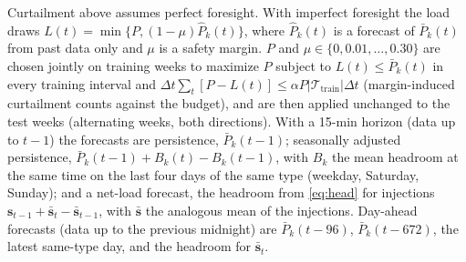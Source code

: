 \documentclass[conference,letterpaper]{IEEEtran}
\begin{document}
Curtailment above assumes perfect foresight. With imperfect foresight the load draws $L(t)=\min\{P,(1-\mu)\hat P_k(t)\}$, where $\hat P_k(t)$ is a forecast of $\bar P_k(t)$ from past data only and $\mu$ is a safety margin. $P$ and $\mu\in\{0,0.01,\dots,0.30\}$ are chosen jointly on training weeks to maximize $P$ subject to $L(t)\le\bar P_k(t)$ in every training interval and $\Delta t\sum_t[P-L(t)]\le\alpha P|\mathcal T_{\mathrm{train}}|\Delta t$ (margin-induced curtailment counts against the budget), and are then applied unchanged to the test weeks (alternating weeks, both directions). With a 15-min horizon (data up to $t-1$) the forecasts are persistence, $\bar P_k(t-1)$; seasonally adjusted persistence, $\bar P_k(t-1)+B_k(t)-B_k(t-1)$, with $B_k$ the mean headroom at the same time on the last four days of the same type (weekday, Saturday, Sunday); and a net-load forecast, the headroom from \eqref{eq:head} for injections $\mathbf s_{t-1}+\bar{\mathbf s}_t-\bar{\mathbf s}_{t-1}$, with $\bar{\mathbf s}$ the analogous mean of the injections. Day-ahead forecasts (data up to the previous midnight) are $\bar P_k(t-96)$, $\bar P_k(t-672)$, the latest same-type day, and the headroom for $\bar{\mathbf s}_t$.
\end{document}

